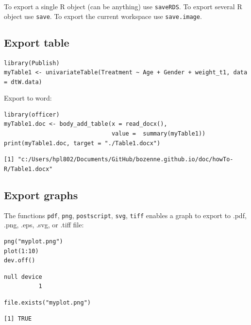 \documentclass{article}
\begin{document}
To export a single R object (can be anything) use \texttt{saveRDS}.
To export several R object use \texttt{save}.
To export the current workspace use \texttt{save.image}.

\subsection{Export table}
\label{sec:org88c2717}

\lstset{language=r,label= ,caption= ,captionpos=b,numbers=none}
\begin{lstlisting}
library(Publish)
myTable1 <- univariateTable(Treatment ~ Age + Gender + weight_t1, data = dtW.data)
\end{lstlisting}

Export to word:
\lstset{language=r,label= ,caption= ,captionpos=b,numbers=none}
\begin{lstlisting}
library(officer)
myTable1.doc <- body_add_table(x = read_docx(), 
                               value =  summary(myTable1)) 
print(myTable1.doc, target = "./Table1.docx")
\end{lstlisting}

\begin{verbatim}
[1] "c:/Users/hpl802/Documents/GitHub/bozenne.github.io/doc/howTo-R/Table1.docx"
\end{verbatim}

\subsection{Export graphs}
\label{sec:orgeef84ec}

The functions \texttt{pdf}, \texttt{png}, \texttt{postscript}, \texttt{svg}, \texttt{tiff} enables a graph to
export to .pdf, .png, .eps, .svg, or .tiff file:
\lstset{language=r,label= ,caption= ,captionpos=b,numbers=none}
\begin{lstlisting}
png("myplot.png")
plot(1:10)
dev.off()
\end{lstlisting}

\begin{verbatim}
null device 
          1
\end{verbatim}


\lstset{language=r,label= ,caption= ,captionpos=b,numbers=none}
\begin{lstlisting}
file.exists("myplot.png")
\end{lstlisting}

\begin{verbatim}
[1] TRUE
\end{verbatim}
\end{document}
